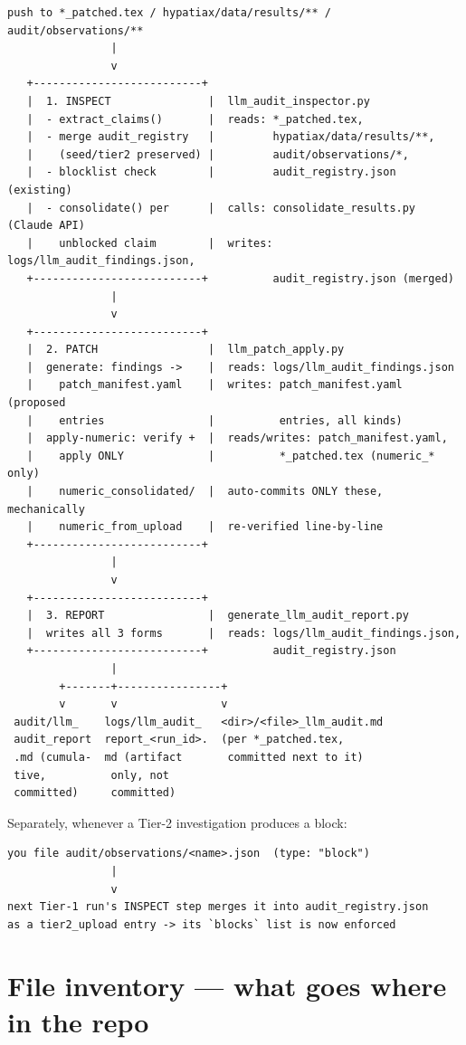 \documentclass[11pt]{article}
\begin{document}
\begin{lstlisting}
push to *_patched.tex / hypatiax/data/results/** / audit/observations/**
                |
                v
   +--------------------------+
   |  1. INSPECT               |  llm_audit_inspector.py
   |  - extract_claims()       |  reads: *_patched.tex,
   |  - merge audit_registry   |         hypatiax/data/results/**,
   |    (seed/tier2 preserved) |         audit/observations/*,
   |  - blocklist check        |         audit_registry.json (existing)
   |  - consolidate() per      |  calls: consolidate_results.py (Claude API)
   |    unblocked claim        |  writes: logs/llm_audit_findings.json,
   +--------------------------+          audit_registry.json (merged)
                |
                v
   +--------------------------+
   |  2. PATCH                 |  llm_patch_apply.py
   |  generate: findings ->    |  reads: logs/llm_audit_findings.json
   |    patch_manifest.yaml    |  writes: patch_manifest.yaml (proposed
   |    entries                |          entries, all kinds)
   |  apply-numeric: verify +  |  reads/writes: patch_manifest.yaml,
   |    apply ONLY             |          *_patched.tex (numeric_* only)
   |    numeric_consolidated/  |  auto-commits ONLY these, mechanically
   |    numeric_from_upload    |  re-verified line-by-line
   +--------------------------+
                |
                v
   +--------------------------+
   |  3. REPORT                |  generate_llm_audit_report.py
   |  writes all 3 forms       |  reads: logs/llm_audit_findings.json,
   +--------------------------+          audit_registry.json
                |
        +-------+----------------+
        v       v                v
 audit/llm_    logs/llm_audit_   <dir>/<file>_llm_audit.md
 audit_report  report_<run_id>.  (per *_patched.tex,
 .md (cumula-  md (artifact       committed next to it)
 tive,          only, not
 committed)     committed)
\end{lstlisting}

Separately, whenever a Tier-2 investigation produces a block:

\begin{lstlisting}
you file audit/observations/<name>.json  (type: "block")
                |
                v
next Tier-1 run's INSPECT step merges it into audit_registry.json
as a tier2_upload entry -> its `blocks` list is now enforced
\end{lstlisting}

\section{File inventory --- what goes where in the repo}
\end{document}
